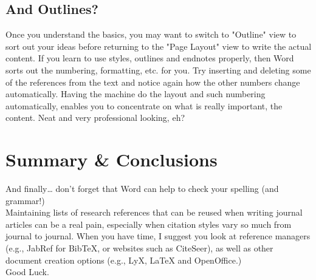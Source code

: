 \documentclass[acmsmall,nonacm]{acmart}
\begin{document}
\subsection{And Outlines?}

Once you understand the basics, you may want to switch to "Outline" view to sort out your ideas before returning to the "Page Layout" view to write the actual content. 
If you learn to use styles, outlines and endnotes properly, then Word sorts out the numbering, formatting, etc. for you. 
Try inserting and deleting some of the references from the text and notice again how the other numbers change automatically. 
Having the machine do the layout and such numbering automatically, enables you to concentrate on what is really important, the content. 
Neat and very professional looking, eh?

\section{Summary {\&} Conclusions}

And finally… don’t forget that Word can help to check your spelling (and grammar!)\\
Maintaining lists of research references that can be reused when writing journal articles 
can be a real pain, especially when citation styles vary so much from journal to journal. 
When you have time, I suggest you look at reference managers (e.g., JabRef for BibTeX, or websites such as CiteSeer), 
as well as other document creation options (e.g., LyX, LaTeX and OpenOffice.)\\
Good Luck.



\end{document}
